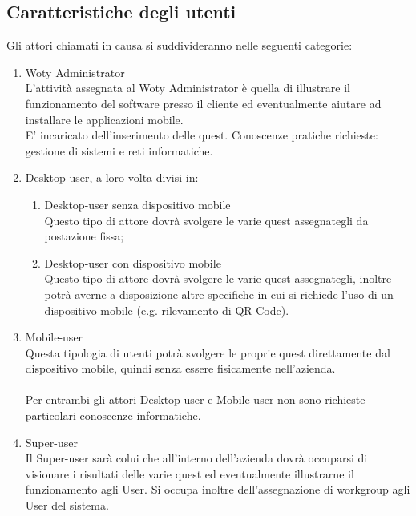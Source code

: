 \newpage

\subsection{Caratteristiche degli utenti}
Gli attori chiamati in causa si suddivideranno nelle seguenti categorie:

\begin{enumerate}

\item Woty Administrator\\
L'attività assegnata al Woty Administrator è quella di illustrare il funzionamento del software presso il cliente ed eventualmente aiutare ad installare le applicazioni mobile.\\
E' incaricato dell'inserimento delle quest. Conoscenze pratiche richieste: gestione di sistemi e reti informatiche.\\

\item Desktop-user, a loro volta divisi in:

\begin{enumerate}

\item Desktop-user senza dispositivo mobile\\
Questo tipo di attore dovrà svolgere le varie quest assegnategli da postazione fissa;

\item Desktop-user con dispositivo mobile\\
Questo tipo di attore dovrà svolgere le varie quest assegnategli, inoltre potrà averne a disposizione altre specifiche in cui si richiede l'uso di un dispositivo mobile (e.g. rilevamento di QR-Code).

\end{enumerate}

\item Mobile-user\\
Questa tipologia di utenti potrà svolgere le proprie quest direttamente dal dispositivo mobile, quindi senza essere fisicamente nell'azienda.

\paragraph{}
Per entrambi gli attori Desktop-user e Mobile-user non sono richieste particolari conoscenze informatiche.

\item Super-user\\
Il Super-user sarà colui che all'interno dell'azienda dovrà occuparsi di visionare i risultati delle varie quest ed eventualmente illustrarne il funzionamento agli User. Si occupa inoltre dell'assegnazione di workgroup agli User del sistema.

\end{enumerate}

